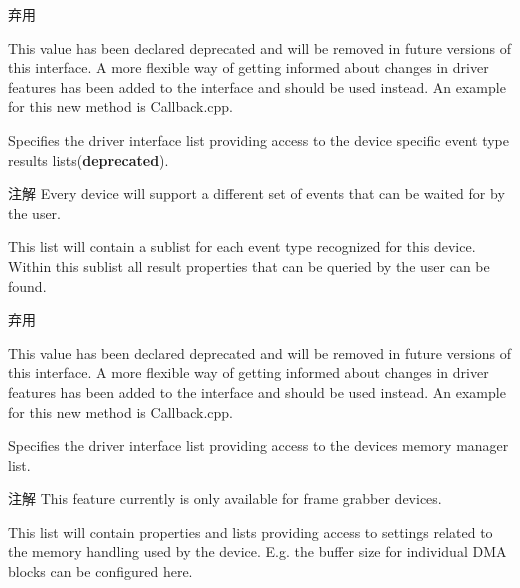 \begin{Desc}
\begin{description}
\begin{DoxyRefDesc}{弃用}
\item[\hyperlink{deprecated__deprecated000016}{弃用}]This value has been declared deprecated and will be removed in future versions of this interface. A more flexible way of getting informed about changes in driver features has been added to the interface and should be used instead. An example for this new method is Callback.\+cpp. \end{DoxyRefDesc}
\item[{\em 
\hypertarget{group___common_interface_gga0dca79bbf0803a4ecec16d6cbb1a3dbba854e3709b91d7b837e17de91404c5a1a}{dlt\+Event\+Sub\+System\+Results}\label{group___common_interface_gga0dca79bbf0803a4ecec16d6cbb1a3dbba854e3709b91d7b837e17de91404c5a1a}
}]Specifies the driver interface list providing access to the device specific event type results lists({\bfseries deprecated}). \begin{DoxyNote}{注解}
Every device will support a different set of events that can be waited for by the user.
\end{DoxyNote}
This list will contain a sublist for each event type recognized for this device. Within this sublist all result properties that can be queried by the user can be found.

\begin{DoxyRefDesc}{弃用}
\item[\hyperlink{deprecated__deprecated000017}{弃用}]This value has been declared deprecated and will be removed in future versions of this interface. A more flexible way of getting informed about changes in driver features has been added to the interface and should be used instead. An example for this new method is Callback.\+cpp. \end{DoxyRefDesc}
\item[{\em 
\hypertarget{group___common_interface_gga0dca79bbf0803a4ecec16d6cbb1a3dbbaad5cff58088e33d2278563fa8f27465f}{dlt\+Image\+Memory\+Manager}\label{group___common_interface_gga0dca79bbf0803a4ecec16d6cbb1a3dbbaad5cff58088e33d2278563fa8f27465f}
}]Specifies the driver interface list providing access to the devices memory manager list. \begin{DoxyNote}{注解}
This feature currently is only available for frame grabber devices.
\end{DoxyNote}
This list will contain properties and lists providing access to settings related to the memory handling used by the device. E.\+g. the buffer size for individual D\+M\+A blocks can be configured here.


\end{description}
\end{Desc}
